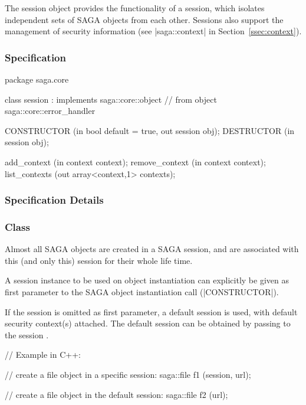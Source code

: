  
  The session object provides the functionality of a session,
   which isolates independent sets of SAGA objects
  from each other.  Sessions also support the management of
  security information (see |saga::context| in
  Section~\ref{ssec:context}).
 
 
 \subsubsection{Specification}
 
 
 \begin{myspec}
  package saga.core
  {
    class session : implements   saga::core::object
                 // from object  saga::core::error_handler
    {
      CONSTRUCTOR        (in  bool             default = true,
                          out session          obj);
      DESTRUCTOR         (in  session          obj);
 
      add_context        (in  context          context);
      remove_context     (in  context          context);
      list_contexts      (out array<context,1> contexts);
    }
  }
 \end{myspec}
 
 
 \subsubsection{Specification Details}
 
 \subsubsection*{Class }
 
    Almost all SAGA objects are created in a SAGA session, and
    are associated with this (and only this) session for their
    whole life time.
 
    A session instance to be used on object
    instantiation can explicitly be given as
    first parameter to the SAGA object instantiation call
    (|CONSTRUCTOR|).
 
    If the session is omitted as first parameter, a
    default session is used, with default security
    context(s) attached.
    The default session can be obtained by passing
     to the session .
 
 \newpage

 \begin{mycode}
      // Example in C++:
 
      // create a file object in a specific session:
      saga::file f1 (session, url);
 
      // create a file object in the default session:
      saga::file f2 (url);
 \end{mycode}
 
